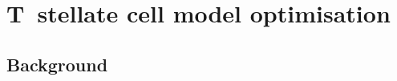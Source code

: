 
\section[TS Cell Models]{T~stellate cell model optimisation}


\subsection{Background}
\label{sec:backgrTS}



